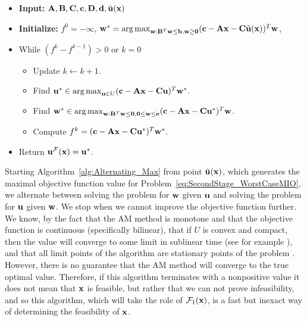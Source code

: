 \documentclass[12pt,x11names]{article}
\theoremstyle{definition}
\newcommand{\bzero}{{\bf 0}}
\newcommand{\bone}{{\bf e}}
\newcommand{\bb}{{\bf b}}
\newcommand{\bc}{{\bf c}}
\newcommand{\bd}{{\bf d}}
\newcommand{\bu}{{\bf u}}
\newcommand{\bw}{{\bf w}}
\newcommand{\bx}{{\bf x}}
\newcommand{\bba}{{\bf A}}
\newcommand{\bbb}{{\bf B}}
\newcommand{\bbc}{{\bf C}}
\newcommand{\bbd}{{\bf D}}
\DeclareMathOperator*{\argmax}{arg\,max}
\begin{document}
\begin{algorithm}[H]\caption{Alternating Maximization (AM)}\label{alg:Alternating_Max}
		\begin{itemize}
       		\item[$\rm{(1)}$] {\bf Input:} $\bba,\bbb,\bbc,\bc,\bbd,\bd, \tilde{\bu}(\bx)$
       		\item[$\rm{(3)}$]{\bf Initialize:} $f^{0}=-\infty$, $\bw^*=\argmax_{\bw:\bbb^T\bw\leq \bb, \bw\geq \bzero}(\bc-\bba\bx-\bbc\tilde{\bu}(\bx))^T\bw$, 
            \item[$\rm{(3)}$] While $(f^k-f^{k-1})> 0$ or $k=0$
            \begin{itemize}
            \item[$\rm{(a)}$] Update $k\leftarrow k+1$.
            \item[$\rm{(b)}$] Find $\bu^*\in\argmax_{\bu\in U} (\bc-\bba\bx-\bbc\bu)^T\bw^*$.
            \item[$\rm{(c)}$] Find $\bw^*\in\argmax_{\bw:\bbb^T\bw\leq \bzero, \bzero\leq \bw\leq \bone} (\bc-\bba\bx-\bbc\bu^*)^T\bw$. 
            \item[$\rm{(d)}$] Compute $f^k=(\bc-\bba\bx-\bbc\bu^*)^T\bw^*$.            
            \end{itemize}     
        \item[$\rm{(4)}$] Return  $\bu^{\mathcal{F}}(\bx)=\bu^*$.     
        \end{itemize} 
\end{algorithm}

Starting Algorithm~\ref{alg:Alternating_Max} from point $\tilde{\bu}(\bx)$, which generates the maximal objective function value for Problem~\eqref{eq:SecondStage_WorstCaseMIO}, we alternate between solving the problem for $\bw$ given $\bu$ and solving the problem for $\bu$ given $\bw$. We stop when we cannot improve the objective function further.
We know, by the fact that the AM method is monotone and that the objective function is continuous (specifically bilinear), that if $U$ is convex and compact, then the value will converge to some limit in sublinear time (see for example \citep[Theorem 10]{shtern2016computational}), and that all
limit points of the algorithm are stationary points of the problem \citep[Corollary 2]{Grippo2000}. However, there is no guarantee that the AM method will converge to the true optimal value. Therefore, if this algorithm terminates with a nonpositive value it does not mean that $\bx$ is feasible, but rather that we can not prove infeasibility, and so this algorithm, which will take the role of $\mathcal{F}_1(\bx)$, is a fast but inexact way of determining the feasibility of $\bx$. 
\end{document}
